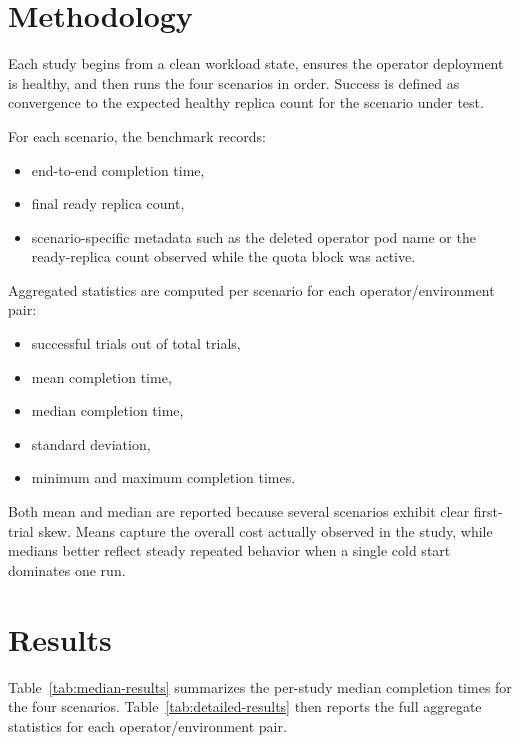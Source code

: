 \documentclass[sigconf,screen]{acmart}
\begin{document}
\section{Methodology}

Each study begins from a clean workload state, ensures the operator deployment
is healthy, and then runs the four scenarios in order. Success is defined as
convergence to the expected healthy replica count for the scenario under test.

For each scenario, the benchmark records:

\begin{itemize}
  \item end-to-end completion time,
  \item final ready replica count,
  \item scenario-specific metadata such as the deleted operator pod name or the
  ready-replica count observed while the quota block was active.
\end{itemize}

Aggregated statistics are computed per scenario for each operator/environment
pair:

\begin{itemize}
  \item successful trials out of total trials,
  \item mean completion time,
  \item median completion time,
  \item standard deviation,
  \item minimum and maximum completion times.
\end{itemize}

Both mean and median are reported because several scenarios exhibit clear
first-trial skew. Means capture the overall cost actually observed in the
study, while medians better reflect steady repeated behavior when a single cold
start dominates one run.

\section{Results}

Table~\ref{tab:median-results} summarizes the per-study median completion times
for the four scenarios. Table~\ref{tab:detailed-results} then reports the full
aggregate statistics for each operator/environment pair.
\end{document}
